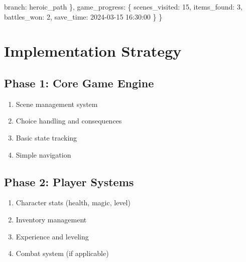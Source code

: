 \documentclass[
  letterpaper,
  DIV=11,
  numbers=noendperiod,
  oneside]{scrreprt}
\newenvironment{Shaded}{}{}
\newcommand{\DecValTok}[1]{\textcolor[rgb]{0.00,0.36,0.77}{#1}}
\newcommand{\NormalTok}[1]{\textcolor[rgb]{0.14,0.16,0.18}{#1}}
\newcommand{\StringTok}[1]{\textcolor[rgb]{0.01,0.18,0.38}{#1}}
\providecommand{\tightlist}{%
  \setlength{\itemsep}{0pt}\setlength{\parskip}{0pt}}\usepackage{longtable,booktabs,array}
\begin{document}
\begin{Shaded}
\begin{Highlighting}[]
        \StringTok{\textquotesingle{}branch\textquotesingle{}}\NormalTok{: }\StringTok{\textquotesingle{}heroic\_path\textquotesingle{}}
\NormalTok{    \},}
    \StringTok{\textquotesingle{}game\_progress\textquotesingle{}}\NormalTok{: \{}
        \StringTok{\textquotesingle{}scenes\_visited\textquotesingle{}}\NormalTok{: }\DecValTok{15}\NormalTok{,}
        \StringTok{\textquotesingle{}items\_found\textquotesingle{}}\NormalTok{: }\DecValTok{3}\NormalTok{,}
        \StringTok{\textquotesingle{}battles\_won\textquotesingle{}}\NormalTok{: }\DecValTok{2}\NormalTok{,}
        \StringTok{\textquotesingle{}save\_time\textquotesingle{}}\NormalTok{: }\StringTok{\textquotesingle{}2024{-}03{-}15 16:30:00\textquotesingle{}}
\NormalTok{    \}}
\NormalTok{\}}
\end{Highlighting}
\end{Shaded}

\section{Implementation Strategy}\label{implementation-strategy-10}

\subsection{Phase 1: Core Game Engine}\label{phase-1-core-game-engine}

\begin{enumerate}
\def\labelenumi{\arabic{enumi}.}
\tightlist
\item
  Scene management system
\item
  Choice handling and consequences
\item
  Basic state tracking
\item
  Simple navigation
\end{enumerate}

\subsection{Phase 2: Player Systems}\label{phase-2-player-systems}

\begin{enumerate}
\def\labelenumi{\arabic{enumi}.}
\tightlist
\item
  Character stats (health, magic, level)
\item
  Inventory management
\item
  Experience and leveling
\item
  Combat system (if applicable)
\end{enumerate}
\end{document}
